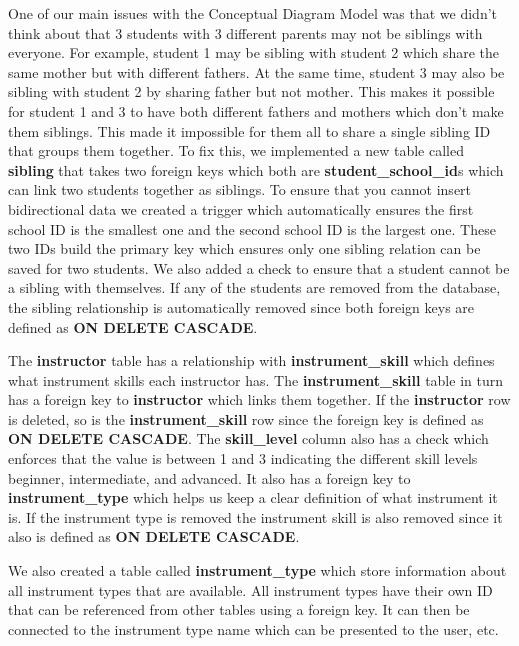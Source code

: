 \documentclass[a4paper]{scrartcl}
\begin{document}
One of our main issues with the Conceptual Diagram Model was that we didn't think about that 3 students with 3 different parents may not be siblings with everyone. For example, student 1 may be sibling with student 2 which share the same mother but with different fathers. At the same time, student 3 may also be sibling with student 2 by sharing father but not mother. This makes it possible for student 1 and 3 to have both different fathers and mothers which don't make them siblings. This made it impossible for them all to share a single sibling ID that groups them together. To fix this, we implemented a new table called \textbf{sibling} that takes two foreign keys which both are \textbf{student\_school\_id}s which can link two students together as siblings. To ensure that you cannot insert bidirectional data we created a trigger which automatically ensures the first school ID is the smallest one and the second school ID is the largest one. These two IDs build the primary key which ensures only one sibling relation can be saved for two students. We also added a check to ensure that a student cannot be a sibling with themselves. If any of the students are removed from the database, the sibling relationship is automatically removed since both foreign keys are defined as \textbf{ON DELETE CASCADE}.

The \textbf{instructor} table has a relationship with \textbf{instrument\_skill} which defines what instrument skills each instructor has. The \textbf{instrument\_skill} table in turn has a foreign key to \textbf{instructor} which links them together. If the \textbf{instructor} row is deleted, so is the \textbf{instrument\_skill} row since the foreign key is defined as \textbf{ON DELETE CASCADE}. The \textbf{skill\_level} column also has a check which enforces that the value is between 1 and 3 indicating the different skill levels beginner, intermediate, and advanced. It also has a foreign key to \textbf{instrument\_type} which helps us keep a clear definition of what instrument it is. If the instrument type is removed the instrument skill is also removed since it also is defined as \textbf{ON DELETE CASCADE}.

We also created a table called \textbf{instrument\_type} which store information about all instrument types that are available. All instrument types have their own ID that can be referenced from other tables using a foreign key. It can then be connected to the instrument type name which can be presented to the user, etc.
\end{document}
